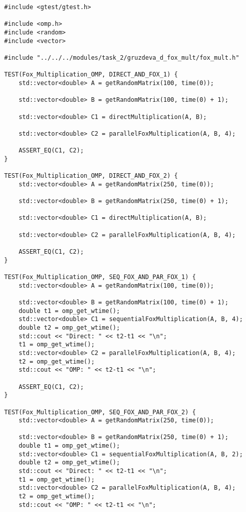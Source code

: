 \documentclass{article}
\begin{document}
\begin{lstlisting}
  #include <gtest/gtest.h>

  #include <omp.h>
  #include <random>
  #include <vector>

  #include "../../../modules/task_2/gruzdeva_d_fox_mult/fox_mult.h"

  TEST(Fox_Multiplication_OMP, DIRECT_AND_FOX_1) {
      std::vector<double> A = getRandomMatrix(100, time(0));

      std::vector<double> B = getRandomMatrix(100, time(0) + 1);

      std::vector<double> C1 = directMultiplication(A, B);

      std::vector<double> C2 = parallelFoxMultiplication(A, B, 4);

      ASSERT_EQ(C1, C2);
  }

  TEST(Fox_Multiplication_OMP, DIRECT_AND_FOX_2) {
      std::vector<double> A = getRandomMatrix(250, time(0));

      std::vector<double> B = getRandomMatrix(250, time(0) + 1);

      std::vector<double> C1 = directMultiplication(A, B);

      std::vector<double> C2 = parallelFoxMultiplication(A, B, 4);

      ASSERT_EQ(C1, C2);
  }

  TEST(Fox_Multiplication_OMP, SEQ_FOX_AND_PAR_FOX_1) {
      std::vector<double> A = getRandomMatrix(100, time(0));

      std::vector<double> B = getRandomMatrix(100, time(0) + 1);
      double t1 = omp_get_wtime();
      std::vector<double> C1 = sequentialFoxMultiplication(A, B, 4);
      double t2 = omp_get_wtime();
      std::cout << "Direct: " << t2-t1 << "\n";
      t1 = omp_get_wtime();
      std::vector<double> C2 = parallelFoxMultiplication(A, B, 4);
      t2 = omp_get_wtime();
      std::cout << "OMP: " << t2-t1 << "\n";

      ASSERT_EQ(C1, C2);
  }

  TEST(Fox_Multiplication_OMP, SEQ_FOX_AND_PAR_FOX_2) {
      std::vector<double> A = getRandomMatrix(250, time(0));

      std::vector<double> B = getRandomMatrix(250, time(0) + 1);
      double t1 = omp_get_wtime();
      std::vector<double> C1 = sequentialFoxMultiplication(A, B, 2);
      double t2 = omp_get_wtime();
      std::cout << "Direct: " << t2-t1 << "\n";
      t1 = omp_get_wtime();
      std::vector<double> C2 = parallelFoxMultiplication(A, B, 4);
      t2 = omp_get_wtime();
      std::cout << "OMP: " << t2-t1 << "\n";


\end{lstlisting}
\end{document}
